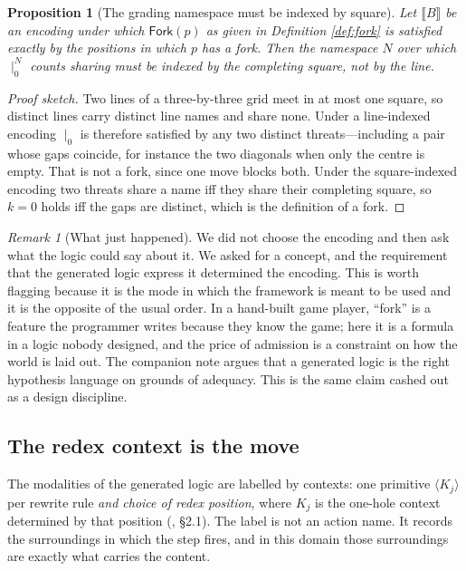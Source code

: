 \documentclass[11pt]{article}
\theoremstyle{definition}
\theoremstyle{plain}
\newtheorem{proposition}[definition]{Proposition}
\theoremstyle{remark}
\newtheorem{remark}[definition]{Remark}
\newcommand{\Frk}{\mathsf{Fork}}
\begin{document}
\begin{proposition}[The grading namespace must be indexed by square]\label{prop:parands}
Let $\llbracket B \rrbracket$ be an encoding under which $\Frk(p)$ as given in
Definition \ref{def:fork} is satisfied exactly by the positions in which $p$ has
a fork. Then the namespace $N$ over which $\mid_0^N$ counts sharing must be
indexed by the completing square, not by the line.
\end{proposition}
\begin{proof}[Proof sketch]
Two lines of a three-by-three grid meet in at most one square, so distinct lines
carry distinct line names and share none. Under a line-indexed encoding $\mid_0$
is therefore satisfied by any two distinct threats---including a pair whose gaps
coincide, for instance the two diagonals when only the centre is empty. That is
not a fork, since one move blocks both. Under the square-indexed encoding two
threats share a name iff they share their completing square, so $k=0$ holds iff
the gaps are distinct, which is the definition of a fork.
\end{proof}

\begin{remark}[What just happened]
We did not choose the encoding and then ask what the logic could say about it.
We asked for a concept, and the requirement that the generated logic express it
determined the encoding. This is worth flagging because it is the mode in which
the framework is meant to be used and it is the opposite of the usual order. In
a hand-built game player, ``fork'' is a feature the programmer writes because
they know the game; here it is a formula in a logic nobody designed, and the
price of admission is a constraint on how the world is laid out. The companion
note argues that a generated logic is the right hypothesis language on grounds
of adequacy. This is the same claim cashed out as a design discipline.
\end{remark}

\subsection{The redex context is the move}\label{sec:K}

The modalities of the generated logic are labelled by contexts: one primitive
$\langle K_j\rangle$ per rewrite rule \emph{and choice of redex position}, where
$K_j$ is the one-hole context determined by that position
(\cite{classifier}, \S2.1). The label is not an action name. It records the
surroundings in which the step fires, and in this domain those surroundings are
exactly what carries the content.
\end{document}
